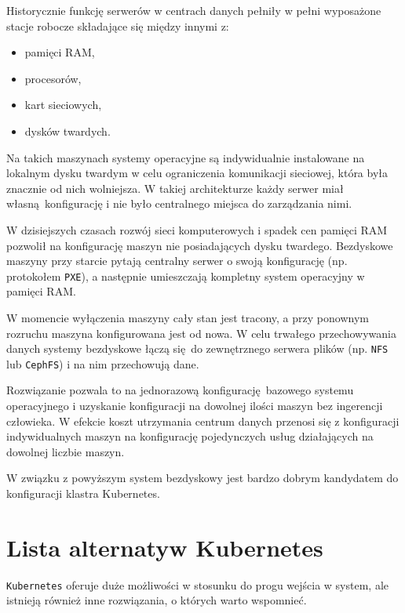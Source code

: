 \documentclass[a4paper,12pt,twoside,openany]{report}
\providecommand{\tightlist}{%
  \setlength{\itemsep}{0pt}\setlength{\parskip}{0pt}}
\newcommand{\passthrough}[1]{#1}
\begin{document}
Historycznie funkcję serwerów w centrach danych pełniły w pełni
wyposażone stacje robocze składające się między innymi z:

\begin{itemize}
\tightlist
\item
  pamięci RAM,
\item
  procesorów,
\item
  kart sieciowych,
\item
  dysków twardych.
\end{itemize}

Na takich maszynach systemy operacyjne są indywidualnie instalowane na
lokalnym dysku twardym w celu ograniczenia komunikacji sieciowej, która
była znacznie od nich wolniejsza. W takiej architekturze każdy serwer
miał własną~konfigurację i nie było centralnego miejsca do zarządzania
nimi.

W dzisiejszych czasach rozwój sieci komputerowych i spadek cen pamięci
RAM pozwolił na konfigurację maszyn nie posiadających dysku twardego.
Bezdyskowe maszyny przy starcie pytają centralny serwer o swoją
konfigurację (np. protokołem \passthrough{\lstinline!PXE!}), a następnie
umieszczają kompletny system operacyjny w pamięci RAM.

W momencie wyłączenia maszyny cały stan jest tracony, a przy ponownym
rozruchu maszyna konfigurowana jest od nowa. W celu trwałego
przechowywania danych systemy bezdyskowe łączą się~do zewnętrznego
serwera plików (np. \passthrough{\lstinline!NFS!} lub
\passthrough{\lstinline!CephFS!}) i na nim przechowują dane.

Rozwiązanie pozwala to na jednorazową konfigurację~bazowego systemu
operacyjnego i uzyskanie konfiguracji na dowolnej ilości maszyn bez
ingerencji człowieka. W efekcie koszt utrzymania centrum danych przenosi
się z konfiguracji indywidualnych maszyn na konfigurację pojedynczych
usług działających na dowolnej liczbie maszyn.

W związku z powyższym system bezdyskowy jest bardzo dobrym kandydatem do
konfiguracji klastra Kubernetes.

\hypertarget{lista-alternatyw-kubernetes}{%
\section{Lista alternatyw
Kubernetes}\label{lista-alternatyw-kubernetes}}

\passthrough{\lstinline!Kubernetes!} oferuje duże możliwości w stosunku
do progu wejścia w system, ale istnieją również inne rozwiązania, o
których warto wspomnieć.
\end{document}

